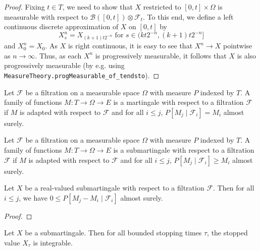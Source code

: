 \begin{proof}
  Fixing $t \in T$, we need to show that $X$ restricted to $[0, t] \times \Omega$ is measurable with respect to $\mathcal{B}([0, t]) \otimes \mathcal{F}_t$.
  To this end, we define a left continuous discrete approximation of $X$ on $[0, t]$ by
  $$X^n_s = X_{(k + 1)t 2^{-n}} \text{ for } s \in (k t 2^{-n}, (k + 1) t 2^{-n}]$$
  and $X^n_0 = X_0$. As $X$ is right continuous, it is easy to see that $X^n \to X$ pointwise as $n \to \infty$.
  Thus, as each $X^n$ is progressively measurable, it follows that $X$ is also progressively measurable
  (by e.g. using \verb|MeasureTheory.progMeasurable_of_tendsto|).
\end{proof}


\begin{definition}[Martingale]\label{def:Martingale}
  \mathlibok
Let $\mathcal{F}$ be a filtration on a measurable space $\Omega$ with measure $P$ indexed by $T$.
A family of functions $M : T \to \Omega \to E$ is a martingale with respect to a filtration $\mathcal{F}$ if $M$ is adapted with respect to $\mathcal{F}$ and for all $i \le j$, $P[M_j \mid \mathcal{F}_i] = M_i$ almost surely.
\end{definition}


\begin{definition}[Submartingale]\label{def:Submartingale}
  \mathlibok
Let $\mathcal{F}$ be a filtration on a measurable space $\Omega$ with measure $P$ indexed by $T$.
A family of functions $M : T \to \Omega \to E$ is a submartingale with respect to a filtration $\mathcal{F}$ if $M$ is adapted with respect to $\mathcal{F}$ and for all $i \le j$, $P[M_j \mid \mathcal{F}_i] \ge M_i$ almost surely.
\end{definition}

\begin{lemma}\label{lem:condExp_sub_nonneg}
  \mathlibok
Let $X$ be a real-valued submartingale with respect to a filtration $\mathcal{F}$. Then for all $i \le j$, we have $0 \le P[M_j - M_i \mid \mathcal{F}_i]$ almost surely.
\end{lemma}

\begin{proof}\mathlibok

\end{proof}


\begin{lemma}\label{lem:Submartingale.integrable_stoppedValue}
  \mathlibok
Let $X$ be a submartingale. Then for all bounded stopping times $\tau$, the stopped value $X_\tau$ is integrable.
\end{lemma}

